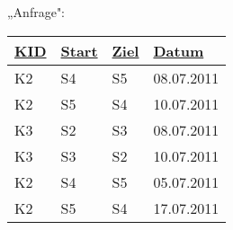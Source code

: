 \documentclass{lehramt-informatik}
\def\TmpUeber#1{{\setul{-0.9em}{}\ul{#1}}}
\begin{document}
{\begin{multicols}{2}
„Anfrage":

\begin{tabular}{|l|l|l|l|}
\hline
\ul{KID} & \TmpUeber{Start} & \TmpUeber{Ziel} & \ul{Datum}\\\hline\hline
K2 & S4 & S5 & 08.07.2011\\\hline
K2 & S5 & S4 & 10.07.2011\\\hline
K3 & S2 & S3 & 08.07.2011\\\hline
K3 & S3 & S2 & 10.07.2011\\\hline
K2 & S4 & S5 & 05.07.2011\\\hline
K2 & S5 & S4 & 17.07.2011\\\hline
\end{tabular}
\end{multicols}
}

\renewcommand{\labelenumi}{\arabic{enumi}.}
\end{document}
